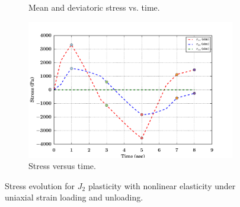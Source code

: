 \begin{figure}[htbp!]
\begin{subfigure}{0.5\textwidth}
    \caption{Mean and deviatoric stress vs. time.}
  \end{subfigure}
  \begin{subfigure}{0.5\textwidth}
    \centering
    \includegraphics[width=\textwidth]{MPMMaterials/FIGS/UniaxialStrainLoadUnloadJ2NonLin_sigma_time.pdf}
    \caption{Stress versus time.}
  \end{subfigure}
  \caption{Stress evolution for $J_2$ plasticity with nonlinear elasticity under uniaxial strain
           loading and unloading.}
  \label{fig:J2NonLinLoadUnload}
\end{figure}

\newpage
